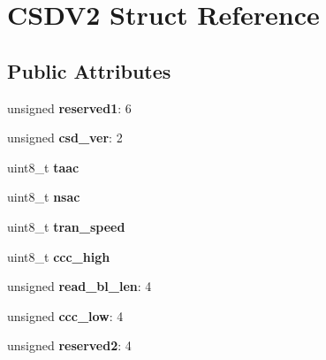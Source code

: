 \hypertarget{struct_c_s_d_v2}{}\section{C\+S\+D\+V2 Struct Reference}
\label{struct_c_s_d_v2}
\subsection*{Public Attributes}
\begin{DoxyCompactItemize}
\item 
\hypertarget{struct_c_s_d_v2_a7778a9786d45cd4efa7bf06d7bded52a}{}unsigned {\bfseries reserved1}\+: 6\label{struct_c_s_d_v2_a7778a9786d45cd4efa7bf06d7bded52a}

\item 
\hypertarget{struct_c_s_d_v2_a59dccb194acb31b218f94f2fbb81f92b}{}unsigned {\bfseries csd\+\_\+ver}\+: 2\label{struct_c_s_d_v2_a59dccb194acb31b218f94f2fbb81f92b}

\item 
\hypertarget{struct_c_s_d_v2_a66975134ee179b2c2d93bf4ae3b522dd}{}uint8\+\_\+t {\bfseries taac}\label{struct_c_s_d_v2_a66975134ee179b2c2d93bf4ae3b522dd}

\item 
\hypertarget{struct_c_s_d_v2_a2fcdefca1df007ad0527d29af26c34ac}{}uint8\+\_\+t {\bfseries nsac}\label{struct_c_s_d_v2_a2fcdefca1df007ad0527d29af26c34ac}

\item 
\hypertarget{struct_c_s_d_v2_a4321f8cba41dcefe65e4d8357b93a705}{}uint8\+\_\+t {\bfseries tran\+\_\+speed}\label{struct_c_s_d_v2_a4321f8cba41dcefe65e4d8357b93a705}

\item 
\hypertarget{struct_c_s_d_v2_a577a7333925acccced97b25905f50c6e}{}uint8\+\_\+t {\bfseries ccc\+\_\+high}\label{struct_c_s_d_v2_a577a7333925acccced97b25905f50c6e}

\item 
\hypertarget{struct_c_s_d_v2_a79cb233cef532dc1682e0ef11f7745dc}{}unsigned {\bfseries read\+\_\+bl\+\_\+len}\+: 4\label{struct_c_s_d_v2_a79cb233cef532dc1682e0ef11f7745dc}

\item 
\hypertarget{struct_c_s_d_v2_ae40da77d4c0d6c911ebd868eceda8ea9}{}unsigned {\bfseries ccc\+\_\+low}\+: 4\label{struct_c_s_d_v2_ae40da77d4c0d6c911ebd868eceda8ea9}

\item 
\hypertarget{struct_c_s_d_v2_a5151e2d94077d2a1ac8361174e4cd55a}{}unsigned {\bfseries reserved2}\+: 4\label{struct_c_s_d_v2_a5151e2d94077d2a1ac8361174e4cd55a}


\end{DoxyCompactItemize}
